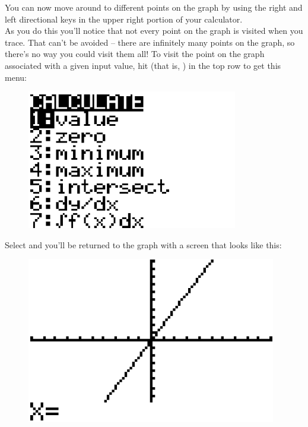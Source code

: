 You can now move around to different points on the graph by using the right and left directional keys in the upper right portion of your calculator.\\

As you do this you’ll notice that not every point on the graph is visited when you trace. That can’t be avoided – there are infinitely many points on the graph, so there’s no way you could visit them all! To visit the point on the graph associated with a given input value, hit   (that is, ) in the top row to get this menu:

\begin{figure}[H]
	\centering
	\includegraphics[scale=1.0]{Sections/FunctionsandGraphsImages/Figure26.png}
\end{figure}

Select  and you’ll be returned to the graph with a screen that looks like this:

\begin{figure}[H]
	\centering
	\includegraphics[scale=1.0]{Sections/FunctionsandGraphsImages/Figure27.png}
\end{figure}

